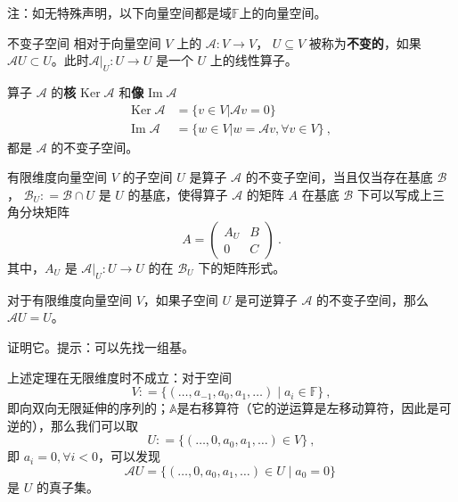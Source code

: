 

注：如无特殊声明，以下向量空间都是域$\mathbb{F}$上的向量空间。

\begin{definition}{不变子空间}
相对于向量空间 $V$ 上的 $\mathcal{A}: V \rightarrow V$， $U \subseteq V$ 被称为\textbf{不变的}，如果 $\mathcal{A} U \subset U$。此时$\mathcal{A}|_U: U \to U$ 是一个 $U$ 上的线性算子。
\end{definition}

\begin{example}{}
算子 $\mathcal{A}$ 的\textbf{核} $\mathrm{Ker}\;\mathcal A$ 和\textbf{像} $\mathrm{Im}\;\mathcal{A}$
\begin{equation}\label{eq_InvSP_3}
\begin{aligned}
\mathrm{Ker}\;\mathcal{A}&=\{ v\in V|\mathcal{A} v= 0\}\\
\mathrm{Im}\;\mathcal{A}&=\{ w\in V| w=\mathcal{A} v,\forall v\in V\}~,
\end{aligned}
\end{equation}
都是 $\mathcal A$ 的不变子空间。
\end{example}

\begin{theorem}{}
有限维度向量空间 $V$ 的子空间 $U$ 是算子 $\mathcal{A}$ 的不变子空间，当且仅当存在基底 $\mathcal{B}$， $\mathcal{B}_U: = \mathcal{B} \cap U$ 是 $U$ 的基底，使得算子 $\mathcal{A}$ 的矩阵 $A$ 在基底 $\mathcal{B}$ 下可以写成上三角分块矩阵
\begin{equation}
A = \begin{pmatrix}
A_U & B\\
0 & C
\end{pmatrix}~.
\end{equation}
其中，$A_U$ 是 $\mathcal{A}|_{U}: U \to U$ 的在 $\mathcal{B}_U$ 下的矩阵形式。
\end{theorem}

\begin{theorem}{}
对于有限维度向量空间 $V$，如果子空间 $U$ 是可逆算子 $\mathcal{A}$ 的不变子空间，那么 $\mathcal{A} U = U$。
\end{theorem}
\begin{exercise}{}
证明它。提示：可以先找一组基。
\end{exercise}

\begin{example}{}
上述定理在无限维度时不成立：对于空间
$$
V: = \{ (\dots, a_{-1}, a_0, a_1, \dots) \mid a_i \in \mathbb{F}\}~,
$$
即向双向无限延伸的序列的；$\mathbb{A}$是右移算符（它的逆运算是左移动算符，因此是可逆的），那么我们可以取
$$
U: = \{ (\dots, 0, a_0, a_1, \dots) \in V \}~,
$$
即 $a_i = 0, \forall i < 0$，可以发现
$$
\mathcal{A} U = \{ (\dots, 0, a_0, a_1, \dots) \in U \mid a_0 = 0 \}~
$$
是 $U$ 的真子集。
\end{example}

